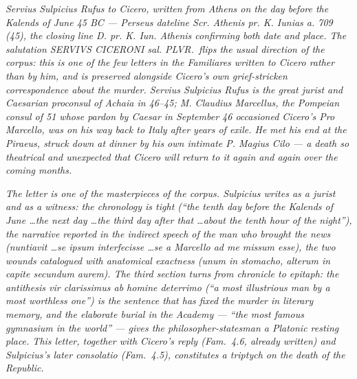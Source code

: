 
\textit{Servius Sulpicius Rufus to Cicero, written from
Athens on the day before the Kalends of June 45 BC ---
Perseus dateline \textit{Scr. Athenis pr. K. Iunias a. 709
(45)}, the closing line \textit{D. pr. K. Iun. Athenis}
confirming both date and place. The salutation
\textit{SERVIVS CICERONI sal. PLVR.}\ flips the usual
direction of the corpus: this is one of the few letters in
the \textit{Familiares} written \textit{to} Cicero rather
than \textit{by} him, and is preserved alongside Cicero's
own grief-stricken correspondence about the murder. Servius
Sulpicius Rufus is the great jurist and Caesarian
proconsul of Achaia in 46--45; M. Claudius Marcellus, the
Pompeian consul of 51 whose pardon by Caesar in September
46 occasioned Cicero's \textit{Pro Marcello}, was on his
way back to Italy after years of exile. He met his end at
the Piraeus, struck down at dinner by his own intimate
P. Magius Cilo --- a death so theatrical and unexpected
that Cicero will return to it again and again over the
coming months.}

\textit{The letter is one of the masterpieces of the
corpus. Sulpicius writes as a jurist and as a witness:
the chronology is tight (``the tenth day before the
Kalends of June \ldots the next day \ldots the third day
after that \ldots about the tenth hour of the night''),
the narrative reported in the indirect speech of the man
who brought the news (\textit{nuntiavit \ldots se ipsum
interfecisse \ldots se a Marcello ad me missum esse}), the
two wounds catalogued with anatomical exactness
(\textit{unum in stomacho, alterum in capite secundum
aurem}). The third section turns from chronicle to
epitaph: the antithesis \textit{vir clarissimus ab homine
deterrimo} (``a most illustrious man by a most worthless
one'') is the sentence that has fixed the murder in
literary memory, and the elaborate burial in the
Academy --- ``the most famous gymnasium in the world''
--- gives the philosopher-statesman a Platonic resting
place. This letter, together with Cicero's reply (Fam.\
4.6, already written) and Sulpicius's later
\textit{consolatio} (Fam.\ 4.5), constitutes a triptych on
the death of the Republic.}

